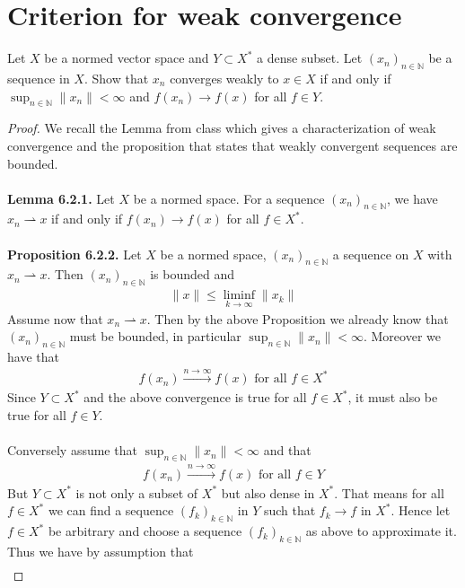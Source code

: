 \documentclass[12pt,a4paper]{article}
\newcommand{\wto}{\rightharpoonup}
\begin{document}
\section{Criterion for weak convergence}
Let $X$ be a normed vector space and $Y \subset X^*$ a dense subset. Let $(x_n)_{n \in \mathbb{N}}$ be a sequence in $X$. Show that $x_n$ converges weakly to $x \in X$ if and only if $\sup_{n \in \mathbb{N}} \| x_n\| < \infty$ and $f(x_n) \to f(x)$ for all $f \in Y$. 
\begin{proof}
We recall the Lemma from class which gives a characterization of weak convergence and the proposition that states that weakly convergent sequences are bounded. 
\\\\
\textbf{Lemma 6.2.1.} Let $X$ be a normed space. For a sequence $(x_n)_{n \in \mathbb{N}}$, we have $x_n \rightharpoonup x$ if and only if $f(x_n) \to f(x)$ for all $f \in X^*$. 
\\\\
\textbf{Proposition 6.2.2.} Let $X$ be a normed space, $(x_n)_{n \in \mathbb{N}}$ a sequence on $X$ with $x_n \rightharpoonup x$. Then $(x_n)_{n \in \mathbb{N}}$ is bounded and 
\begin{align*}
\| x \| \leq \liminf_{k \to \infty} \|x_k \|
\end{align*}
Assume now that $x_n \wto x$. Then by the above Proposition we already know that $(x_n)_{n \in \mathbb{N}}$ must be bounded, in particular $\sup_{n \in \mathbb{N}} \| x_n \| <  \infty$.  Moreover we have that \begin{align*}
f(x_n) \overset{n \to \infty} \longrightarrow f(x) \text{ for all } f \in X^*
\end{align*} 
Since $Y \subset X^*$ and the above convergence is true for all $f \in X^*$, it must also be true for all $f \in Y$. \\
\\
Conversely assume that $\sup_{n \in \mathbb{N}} \| x_n \| < \infty$ and that 
\begin{align*}
f(x_n) \overset{n \to \infty} \longrightarrow f(x) \text{ for all } f \in Y
\end{align*}
But $Y \subset X^*$ is not only a subset of $X^*$ but also dense in $X^*$. That means for all $f \in X^*$ we can find a sequence $(f_k)_{k \in \mathbb{N}}$ in $Y$ such that $f_k \to f$ in $X^*$. Hence let $f \in X^*$ be arbitrary and choose a sequence $(f_k)_{k \in \mathbb{N}}$ as above to approximate it. Thus we have by assumption that 
\begin{align*}

\end{align*}
\end{proof}
\end{document}
